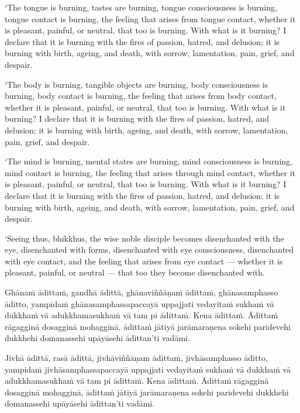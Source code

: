 ‘The tongue is burning, tastes are burning, tongue consciousness is
burning, tongue contact is burning, the feeling that arises from tongue
contact, whether it is pleasant, painful, or neutral, that too is
burning. With what is it burning? I declare that it is burning with the
fires of passion, hatred, and delusion; it is burning with birth,
ageing, and death, with sorrow, lamentation, pain, grief, and despair.

‘The body is burning, tangible objects are burning, body consciousness
is burning, body contact is burning, the feeling that arises from body
contact, whether it is pleasant, painful, or neutral, that too is
burning. With what is it burning? I declare that it is burning with the
fires of passion, hatred, and delusion; it is burning with birth,
ageing, and death, with sorrow, lamentation, pain, grief, and despair.

‘The mind is burning, mental states are burning, mind consciousness is
burning, mind contact is burning, the feeling that arises through mind
contact, whether it is pleasant, painful, or neutral, that too is
burning. With what is it burning? I declare that it is burning with the
fires of passion, hatred, and delusion; it is burning with birth,
ageing, and death, with sorrow, lamentation, pain, grief, and despair.

‘Seeing thus, bhikkhus, the wise noble disciple becomes disenchanted
with the eye, disenchanted with forms, disenchanted with eye
consciousness, disenchanted with eye contact, and the feeling that
arises from eye contact --- whether it is pleasant, painful, or
neutral --- that too they become disenchanted with.

\clearpage

\paliText
\markboth{\paliTitle}{\rightmark}

Ghānaṁ ādittaṁ, gandhā ādittā, ghānaviññāṇaṁ ādittaṁ, ghānasamphasso
āditto, yampidaṁ ghānasamphassapaccayā uppajjati vedayitaṁ sukhaṁ vā
dukkhaṁ vā adukkhamasukhaṁ vā tam pi ādittaṁ. Kena ādittaṁ. Ādittaṁ
rāgagginā dosagginā mohagginā, ādittaṁ jātiyā jarāmaraṇena sokehi
paridevehi dukkhehi domanassehi upāyāsehi ādittan'ti vadāmi.

Jivhā ādittā, rasā ādittā, jivhāviññāṇam ādittaṁ, jivhāsamphasso āditto,
yampidaṁ jivhāsamphassapaccayā uppajjati vedayitaṁ sukhaṁ vā dukkhaṁ vā
adukkhamasukhaṁ vā tam pi ādittaṁ. Kena ādittaṁ. Ādittaṁ rāgagginā
dosagginā mohagginā, ādittaṁ jātiyā jarāmaraṇena sokehi paridevehi
dukkhehi domanassehi upāyāsehi ādittan'ti vadāmi.


